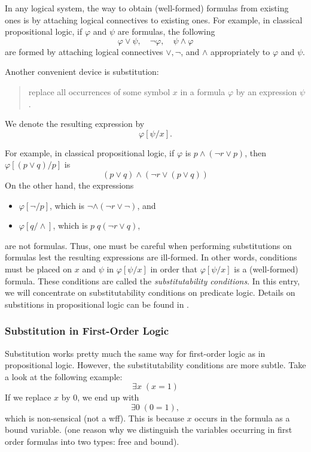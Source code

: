 \documentclass[12pt]{article}
\begin{document}
In any logical system, the way to obtain (well-formed) formulas from existing ones is by attaching logical connectives to existing ones.  For example, in classical propositional logic, if $\varphi$ and $\psi$ are formulas, the following $$\varphi\vee \psi, \quad \neg \varphi, \quad \psi \wedge \varphi$$
are formed by attaching logical connectives $\vee,\neg$, and $\wedge$ appropriately to $\varphi$ and $\psi$.

Another convenient device is substitution:
\begin{quote}
replace all occurrences of some symbol $x$ in a formula $\varphi$ by an expression $\psi$.
\end{quote}
We denote the resulting expression by $$\varphi[\psi/x].$$

For example, in classical propositional logic, if $\varphi$ is $p \wedge (\neg r \vee p)$, then $\varphi[(p\vee q)/p]$ is $$(p\vee q)\wedge (\neg r \vee (p\vee q))$$
On the other hand, the expressions
\begin{itemize}
\item $\varphi[\neg / p]$, which is $\neg \wedge (\neg r \vee \neg)$, and 
\item $\varphi[q / \wedge]$, which is $p \; q (\neg r \vee q)$,
\end{itemize}
are not formulas.  Thus, one must be careful when performing substitutions on formulas lest the resulting expressions are ill-formed.  In other words, conditions must be placed on $x$ and $\psi$ in $\varphi[\psi/x]$ in order that $\varphi[\psi/x]$ is a (well-formed) formula.  These conditions are called the \emph{substitutability conditions}.  In this entry, we will concentrate on substitutability conditions on predicate logic.  Details on substitions in propositional logic can be found in .

\subsubsection*{Substitution in First-Order Logic}

Substitution works pretty much the same way for first-order logic as in propositional logic.  However, the substitutability conditions are more subtle.  Take a look at the following example: $$\exists x \; (x=1)$$
If we replace $x$ by $0$, we end up with $$\exists 0 \; (0=1),$$ which is non-sensical (not a wff).  This is because $x$ occurs in the formula as a bound variable. (one reason why we distinguish the variables occurring in first order formulas into two types: free and bound).  
\end{document}
